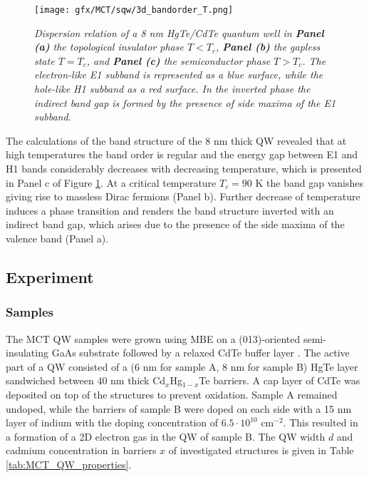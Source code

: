 \documentclass[titlepage,a4paper]{book}
\newcommand{\wciecie}{\quad\phantom{v}}
\begin{document}
\begin{figure}[ht]
	\centering
	\texttt{[image: gfx/MCT/sqw/3d\_bandorder\_T.png]}
	\vspace{-10pt}
	\caption{\textit{Dispersion relation of a 8 nm HgTe/CdTe quantum well in \textbf{Panel (a)} the topological insulator phase $T < T_c$, \textbf{Panel (b)} the gapless state $T = T_c$, and \textbf{Panel (c)} the semiconductor phase $T > T_c$. The electron-like E1 subband is represented as a blue surface, while the hole-like H1 subband as a red surface. In the inverted phase the indirect band gap is formed by the presence of side maxima of the E1 subband.}}
	\label{fig:3D_bandorder_HgTe}
\end{figure} 

The calculations of the band structure of the 8 nm thick QW revealed that at high temperatures the band order is regular and the energy gap between E1 and H1 bands considerably decreases with decreasing temperature, which is presented in Panel c of Figure \ref{fig:3D_bandorder_HgTe}. At a critical temperature $T_c = 90$ K the band gap vanishes giving rise to massless Dirac fermions (Panel b). Further decrease of temperature induces a phase transition and renders the band structure inverted with an indirect band gap, which arises due to the presence of the side maxima of the valence band (Panel a).

\subsection{Experiment}
\subsubsection{Samples}
\wciecie
The MCT QW samples were grown using MBE on a (013)-oriented semi-insulating GaAs substrate followed by a relaxed CdTe buffer layer \cite{Dvoretsky_Samples}. The active part of a QW consisted of a (6 nm for sample A, 8 nm for sample B) HgTe layer sandwiched between 40 nm thick Cd$_x$Hg$_{1-x}$Te barriers. A cap layer of CdTe was deposited on top of the structures to prevent oxidation. Sample A remained undoped, while the barriers of sample B were doped on each side with a 15 nm layer of indium with the doping concentration of $6.5\cdot10^{10}$ cm$^{-2}$. This resulted in a formation of a 2D electron gas in the QW of sample B. The QW width $d$ and cadmium concentration in barriers $x$ of investigated structures is given in Table \ref{tab:MCT_QW_properties}.   
\end{document}
